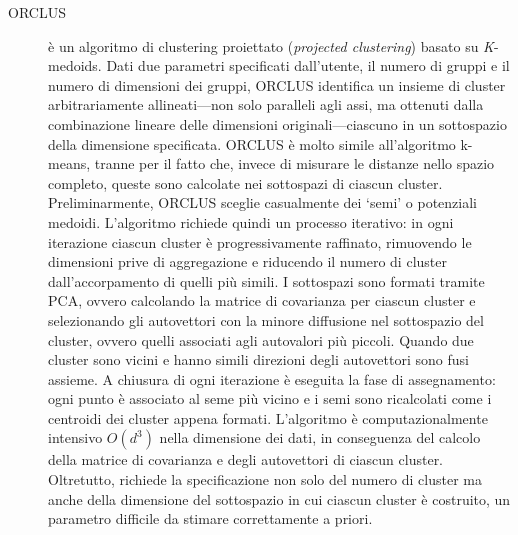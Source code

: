 \begin{description}
\item[ORCLUS] \`e un algoritmo di clustering proiettato (\textit{projected clustering}) basato su \textit{K}-medoids. Dati due parametri specificati dall'utente, il numero di gruppi e il numero di dimensioni dei gruppi, ORCLUS identifica un insieme di cluster arbitrariamente allineati---non solo paralleli agli assi, ma ottenuti dalla combinazione lineare delle dimensioni originali---ciascuno in un sottospazio della dimensione specificata. ORCLUS \`e molto simile all'algoritmo k-means, tranne per il fatto che, invece di misurare le distanze nello spazio completo, queste sono calcolate nei sottospazi di ciascun cluster. Preliminarmente, ORCLUS sceglie casualmente dei `semi' o potenziali medoidi. L'algoritmo richiede quindi un processo iterativo: in ogni iterazione ciascun cluster \`e progressivamente raffinato, rimuovendo le dimensioni prive di aggregazione e riducendo il numero di cluster dall'accorpamento di quelli pi\`u simili. I sottospazi sono formati tramite PCA, ovvero calcolando la matrice di covarianza per ciascun cluster e selezionando gli autovettori con la minore diffusione nel sottospazio del cluster, ovvero quelli associati agli autovalori pi\`u piccoli. Quando due cluster sono vicini e hanno simili direzioni degli autovettori sono fusi assieme. A chiusura di ogni iterazione \`e eseguita la fase di assegnamento: ogni punto \`e associato al seme pi\`u vicino e i semi sono ricalcolati come i centroidi dei cluster appena formati. L'algoritmo \`e computazionalmente intensivo $O(d^3)$ nella dimensione dei dati, in conseguenza del calcolo della matrice di covarianza e degli autovettori di ciascun cluster. Oltretutto, richiede la specificazione non solo del numero di cluster ma anche della dimensione del sottospazio in cui ciascun cluster \`e costruito, un parametro difficile da stimare correttamente a priori.

\end{description}

